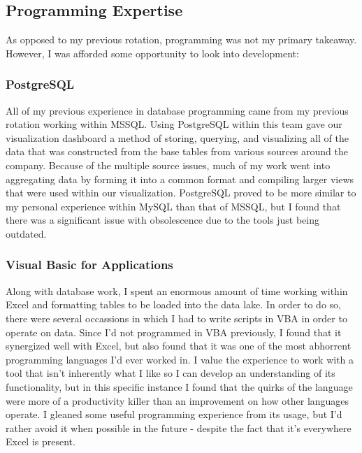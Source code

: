 \documentclass{article}
\begin{document}
\subsection{Programming Expertise}
As opposed to my previous rotation, programming was not my primary takeaway. However, I was afforded some opportunity to look into development:
\subsubsection{PostgreSQL}
All of my previous experience in database programming came from my previous rotation working within MSSQL. Using PostgreSQL within this team gave our visualization dashboard a method of storing, querying, and visualizing all of the data that was constructed from the base tables from various sources around the company. Because of the multiple source issues, much of my work went into aggregating data by forming it into a common format and compiling larger views that were used within our visualization. PostgreSQL proved to be more similar to my personal experience within MySQL than that of MSSQL, but I found that there was a significant issue with obsolescence due to the tools just being outdated.
\subsubsection{Visual Basic for Applications}
Along with database work, I spent an enormous amount of time working within Excel and formatting tables to be loaded into the data lake. In order to do so, there were several occassions in which I had to write scripts in VBA in order to operate on data. Since I'd not programmed in VBA previously, I found that it synergized well with Excel, but also found that it was one of the most abhorrent programming languages I'd ever worked in. I value the experience to work with a tool that isn't inherently what I like so I can develop an understanding of its functionality, but in this specific instance I found that the quirks of the language were more of a productivity killer than an improvement on how other languages operate. I gleaned some useful programming experience from its usage, but I'd rather avoid it when possible in the future - despite the fact that it's everywhere Excel is present.

\end{document}
